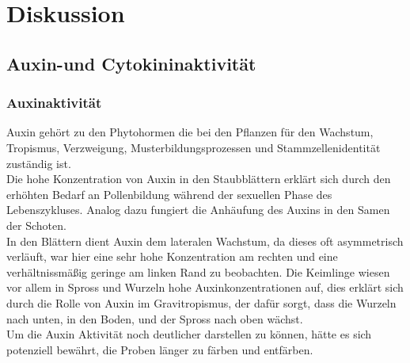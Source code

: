 \documentclass[10pt,a4paper]{article}
\begin{document}
	\section{Diskussion}
	
	\subsection{Auxin-und Cytokininaktivität}
	\subsubsection{Auxinaktivität}
	Auxin gehört zu den Phytohormen die bei den Pflanzen für den Wachstum, Tropismus, Verzweigung, Musterbildungsprozessen und Stammzellenidentität zuständig ist.\\
	Die hohe Konzentration von Auxin in den Staubblättern erklärt sich durch den erhöhten Bedarf an Pollenbildung während der sexuellen Phase des Lebenszykluses. Analog dazu fungiert die Anhäufung des Auxins in den Samen der Schoten. \\
	In den Blättern dient Auxin dem lateralen Wachstum, da dieses oft asymmetrisch verläuft, war hier eine sehr hohe Konzentration am rechten und eine verhältnissmäßig geringe am linken Rand zu beobachten. Die Keimlinge wiesen vor allem in Spross und Wurzeln hohe Auxinkonzentrationen auf, dies erklärt sich durch die Rolle von Auxin im Gravitropismus, der dafür sorgt, dass die Wurzeln nach unten, in den Boden, und der Spross nach oben wächst.\\
	Um die Auxin Aktivität noch deutlicher darstellen zu können, hätte es sich potenziell bewährt, die Proben länger zu färben und entfärben﻿.
\end{document}
